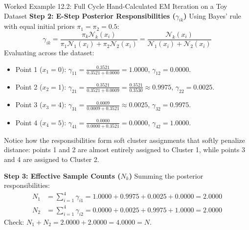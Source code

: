 \begin{examplebox}[breakable]{Worked Example 12.2: Full Cycle Hand-Calculated EM Iteration on a Toy Dataset}
\textbf{Step 2: E-Step Posterior Responsibilities ($\gamma_{ik}$)}
Using Bayes' rule with equal initial priors $\pi_1 = \pi_2 = 0.5$:
\begin{equation}
\gamma_{ik} = \frac{\pi_k \mathcal{N}_k(x_i)}{\pi_1 \mathcal{N}_1(x_i) + \pi_2 \mathcal{N}_2(x_i)} = \frac{\mathcal{N}_k(x_i)}{\mathcal{N}_1(x_i) + \mathcal{N}_2(x_i)}
\end{equation}
Evaluating across the dataset:
\begin{itemize}
    \item Point 1 ($x_1 = 0$): $\gamma_{11} = \frac{0.3521}{0.3521 + 0.0000} = \mathbf{1.0000}$, $\gamma_{12} = \mathbf{0.0000}$.
    \item Point 2 ($x_2 = 1$): $\gamma_{21} = \frac{0.3521}{0.3521 + 0.0009} = \frac{0.3521}{0.3530} \approx \mathbf{0.9975}$, $\gamma_{22} = \mathbf{0.0025}$.
    \item Point 3 ($x_3 = 4$): $\gamma_{31} = \frac{0.0009}{0.0009 + 0.3521} \approx \mathbf{0.0025}$, $\gamma_{32} = \mathbf{0.9975}$.
    \item Point 4 ($x_4 = 5$): $\gamma_{41} = \frac{0.0000}{0.0000 + 0.3521} = \mathbf{0.0000}$, $\gamma_{42} = \mathbf{1.0000}$.
\end{itemize}
Notice how the responsibilities form soft cluster assignments that softly penalize distance: points 1 and 2 are almost entirely assigned to Cluster 1, while points 3 and 4 are assigned to Cluster 2.

\textbf{Step 3: Effective Sample Counts ($N_k$)}
Summing the posterior responsibilities:
\begin{align}
N_1 &= \sum_{i=1}^4 \gamma_{i1} = 1.0000 + 0.9975 + 0.0025 + 0.0000 = \mathbf{2.0000} \\
N_2 &= \sum_{i=1}^4 \gamma_{i2} = 0.0000 + 0.0025 + 0.9975 + 1.0000 = \mathbf{2.0000}
\end{align}
Check: $N_1 + N_2 = 2.0000 + 2.0000 = 4.0000 = N$.


\end{examplebox}
